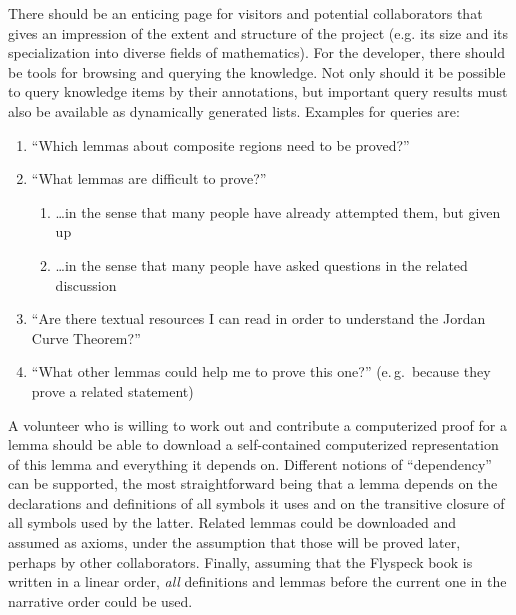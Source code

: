 There should be an enticing page for visitors and potential
collaborators that gives an impression of the extent and structure of
the project (e.g. its size and its specialization into diverse fields
of mathematics).  For the developer, there should be tools for
browsing and querying the knowledge.  Not only should it be possible
to query knowledge items by their annotations, but important query
results must also be available as dynamically generated lists.
Examples for queries are:

\begin{enumerate}
\item\label{item:proven-lemma} ``Which lemmas about composite regions need
  to be proved?''
\item ``What lemmas are difficult to prove?''
  \begin{enumerate}
  \item \ldots in the sense that many people have already attempted them, but given up
  \item\label{item:question-count} \ldots in the sense that many people have asked
    questions in the related discussion
  \end{enumerate}
\item ``Are there textual resources I can read in order to understand the Jordan
  Curve Theorem?''
\item ``What other lemmas could help me to prove this one?'' (e.\,g.\ because
  they prove a related statement)
\end{enumerate}

A volunteer who is willing to work out and contribute a computerized proof for a
lemma should be able to download a self-contained computerized representation of
this lemma and everything it depends on.  Different notions of ``dependency''
can be supported, the most straightforward being that a lemma depends on the
declarations and definitions of all symbols it uses and on the transitive
closure of all symbols used by the latter.  Related lemmas could be downloaded
and assumed as axioms, under the assumption that those will be proved later,
perhaps by other collaborators.  Finally, assuming that the Flyspeck book is
written in a linear order, \emph{all} definitions and lemmas before the current
one in the narrative order could be used.

